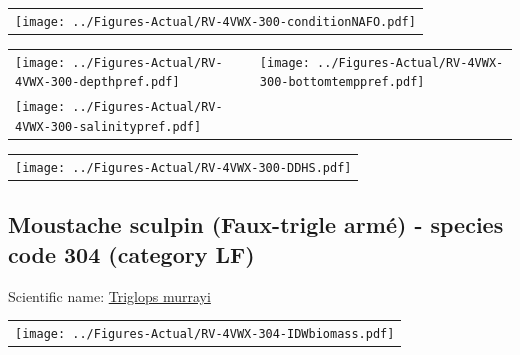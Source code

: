 \documentclass[12pt]{article}\usepackage[]{graphicx}\usepackage[]{color}
\begin{document}
\vspace{1cm}
\begin{minipage}{1.0\textwidth}
 \begin{tabular}{c}
\texttt{[image: ../Figures-Actual/RV-4VWX-300-conditionNAFO.pdf]} \\ 
\end{tabular} 
\end{minipage}
\clearpage
\begin{minipage}{1.0\textwidth}
 \begin{tabular}[t]{m{3in}m{3in}}
\texttt{[image: ../Figures-Actual/RV-4VWX-300-depthpref.pdf]} & 
\texttt{[image: ../Figures-Actual/RV-4VWX-300-bottomtemppref.pdf]} \\ 
\texttt{[image: ../Figures-Actual/RV-4VWX-300-salinitypref.pdf]} & 
 \\ 
\end{tabular} 
\end{minipage}
\newline

\vspace{1cm}
\begin{minipage}{1.0\textwidth}
 \begin{tabular}{c}
\texttt{[image: ../Figures-Actual/RV-4VWX-300-DDHS.pdf]} \\ 
\end{tabular} 
\end{minipage}
\clearpage

\renewcommand\thefigure{\thesubsection\Alph{figure}}

\setcounter{figure}{0}

\hypertarget{sec:304}{%
\subsection{Moustache sculpin (Faux-trigle armé) - species code 304 (category LF)}\label{sec:304}}

  


Scientific name: \href{http://www.marinespecies.org/aphia.php?p=taxdetails\&id=127205}{Triglops murrayi} \newline
\begin{minipage}{1.0\textwidth}
 \begin{tabular}{c}
\texttt{[image: ../Figures-Actual/RV-4VWX-304-IDWbiomass.pdf]} \\ 
\end{tabular} 
\end{minipage}
\newline
\end{document}
